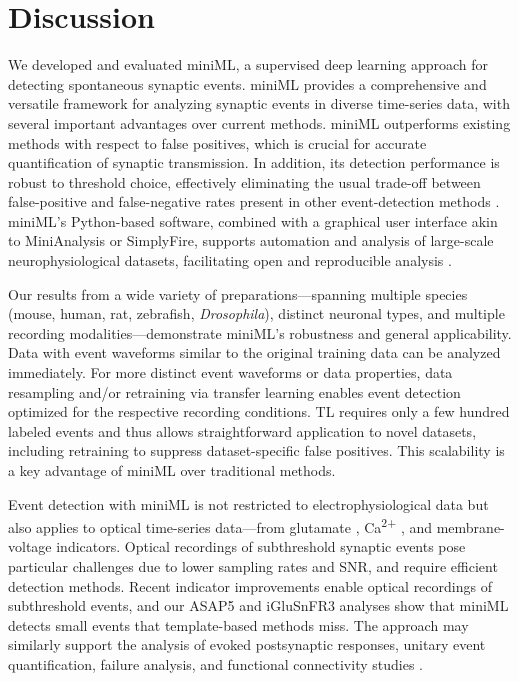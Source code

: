 \documentclass[9pt,lineno]{article}
\begin{document}
\section{Discussion}

We developed and evaluated miniML, a supervised deep learning approach for detecting spontaneous synaptic events. miniML provides a comprehensive and versatile framework for analyzing synaptic events in diverse time-series data, with several important advantages over current methods. miniML outperforms existing methods with respect to false positives, which is crucial for accurate quantification of synaptic transmission. In addition, its detection performance is robust to threshold choice, effectively eliminating the usual trade-off between false-positive and false-negative rates present in other event-detection methods \citep{ClementsBekkers1997,Merel2016,Mori2024,PerniaAndrade2012}. miniML's Python-based software, combined with a graphical user interface akin to MiniAnalysis or SimplyFire, supports automation and analysis of large-scale neurophysiological datasets, facilitating open and reproducible analysis \citep{Ascoli2017,Ferguson2014}.

Our results from a wide variety of preparations---spanning multiple species (mouse, human, rat, zebrafish, \textit{Drosophila}), distinct neuronal types, and multiple recording modalities---demonstrate miniML's robustness and general applicability. Data with event waveforms similar to the original training data can be analyzed immediately. For more distinct event waveforms or data properties, data resampling and/or retraining via transfer learning enables event detection optimized for the respective recording conditions. TL requires only a few hundred labeled events and thus allows straightforward application to novel datasets, including retraining to suppress dataset-specific false positives. This scalability is a key advantage of miniML over traditional methods.

Event detection with miniML is not restricted to electrophysiological data but also applies to optical time-series data---from glutamate \citep{Aggarwal2023}, Ca\textsuperscript{2+} \citep{TranStricker2021}, and membrane-voltage \citep{Li2020} indicators. Optical recordings of subthreshold synaptic events pose particular challenges due to lower sampling rates and SNR, and require efficient detection methods. Recent indicator improvements \citep{Evans2023,Hao2024,ZhangRozsa2023} enable optical recordings of subthreshold events, and our ASAP5 and iGluSnFR3 analyses show that miniML detects small events that template-based methods miss. The approach may similarly support the analysis of evoked postsynaptic responses, unitary event quantification, failure analysis, and functional connectivity studies \citep{Campagnola2022}.
\end{document}
